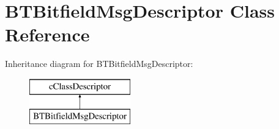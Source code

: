 \hypertarget{classBTBitfieldMsgDescriptor}{}\section{B\+T\+Bitfield\+Msg\+Descriptor Class Reference}
\label{classBTBitfieldMsgDescriptor}
Inheritance diagram for B\+T\+Bitfield\+Msg\+Descriptor\+:\begin{figure}[H]
\begin{center}
\leavevmode
\includegraphics[height=2.000000cm]{classBTBitfieldMsgDescriptor}
\end{center}
\end{figure}
